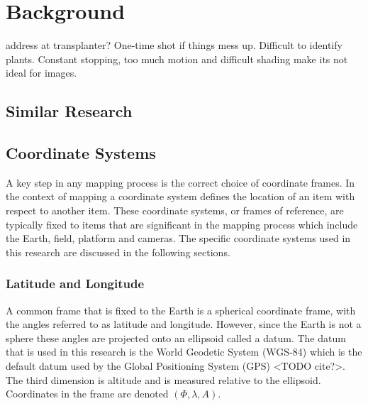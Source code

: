 
\cleardoublepage

\chapter{Background}
\label{background}

address at transplanter?  One-time shot if things mess up.  Difficult to identify plants.  Constant stopping, too much motion and difficult shading make its not ideal for images. 

\section{Similar Research}


\section{Coordinate Systems}

A key step in any mapping process is the correct choice of coordinate frames.  In the context of mapping a coordinate system defines the location of an item with respect to another item.  These coordinate systems, or frames of reference, are typically fixed to items that are significant in the mapping process which include the Earth, field, platform and cameras.  The specific coordinate systems used in this research are discussed in the following sections.

\subsection{Latitude and Longitude}

A common frame that is fixed to the Earth is a spherical coordinate frame, with the angles referred to as latitude and longitude. However, since the Earth is not a sphere these angles are projected onto an ellipsoid called a datum.  The datum that is used in this research is the World Geodetic System (WGS-84) which is the default datum used by the Global Positioning System (GPS) <TODO cite?>.  The third dimension is altitude and is measured relative to the ellipsoid.  Coordinates in the frame are denoted $(\Phi, \lambda, A)$.

